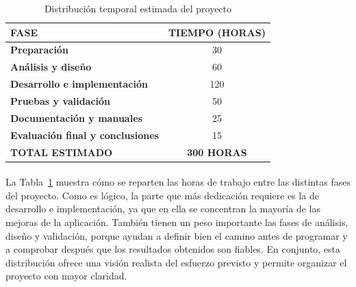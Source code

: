 \begin{table}[H]
\centering
\caption{Distribución temporal estimada del proyecto}
\label{tab:cronograma-trabajo}
\begin{tabular}{|p{9cm}|c|}
\hline
\rowcolor{blue!20!white}
\textbf{FASE} & \textbf{TIEMPO (HORAS)} \\
\hline
\textcolor{blue!60!black}{\textbf{Preparación}} & 30 \\
\hline
\textcolor{blue!60!black}{\textbf{Análisis y diseño}} & 60 \\
\hline
\textcolor{blue!60!black}{\textbf{Desarrollo e implementación}} & 120 \\
\hline
\textcolor{blue!60!black}{\textbf{Pruebas y validación}} & 50 \\
\hline
\textcolor{blue!60!black}{\textbf{Documentación y manuales}} & 25 \\
\hline
\textcolor{blue!60!black}{\textbf{Evaluación final y conclusiones}} & 15 \\
\hline
\rowcolor{blue!20!white}
\textbf{TOTAL ESTIMADO} & \textbf{300 HORAS} \\
\hline
\end{tabular}
\end{table}

\paragraph*{}La Tabla~\ref{tab:cronograma-trabajo} muestra cómo se reparten las horas de trabajo entre las distintas fases del proyecto. Como es lógico, la parte que más dedicación requiere es la de desarrollo e implementación, ya que en ella se concentran la mayoría de las mejoras de la aplicación. También tienen un peso importante las fases de análisis, diseño y validación, porque ayudan a definir bien el camino antes de programar y a comprobar después que los resultados obtenidos son fiables. En conjunto, esta distribución ofrece una visión realista del esfuerzo previsto y permite organizar el proyecto con mayor claridad.
